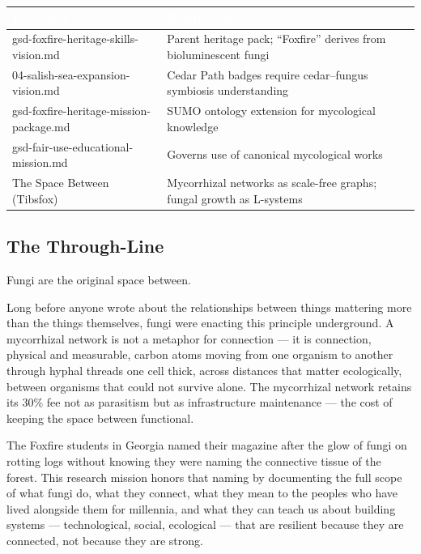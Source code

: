 \documentclass[11pt,letterpaper]{article}
\newcommand{\tableheader}[1]{\textbf{\sffamily\textcolor{white}{#1}}}
\begin{document}
\begin{center}
\begin{tabularx}{\textwidth}{L{4.5cm}X}
\toprule
{}
\tableheader{Document} & \tableheader{Relationship} \\
\midrule
gsd-foxfire-heritage-skills-vision.md & Parent heritage pack; ``Foxfire'' derives from bioluminescent fungi \\
04-salish-sea-expansion-vision.md & Cedar Path badges require cedar--fungus symbiosis understanding \\
gsd-foxfire-heritage-mission-package.md & SUMO ontology extension for mycological knowledge \\
gsd-fair-use-educational-mission.md & Governs use of canonical mycological works \\
The Space Between (Tibsfox) & Mycorrhizal networks as scale-free graphs; fungal growth as L-systems \\
\bottomrule
\end{tabularx}
\end{center}

\subsection{The Through-Line}

Fungi are the original space between.

Long before anyone wrote about the relationships between things mattering more than the things themselves, fungi were enacting this principle underground. A mycorrhizal network is not a metaphor for connection --- it is connection, physical and measurable, carbon atoms moving from one organism to another through hyphal threads one cell thick, across distances that matter ecologically, between organisms that could not survive alone. The mycorrhizal network retains its 30\% fee not as parasitism but as infrastructure maintenance --- the cost of keeping the space between functional.

The Foxfire students in Georgia named their magazine after the glow of fungi on rotting logs without knowing they were naming the connective tissue of the forest. This research mission honors that naming by documenting the full scope of what fungi do, what they connect, what they mean to the peoples who have lived alongside them for millennia, and what they can teach us about building systems --- technological, social, ecological --- that are resilient because they are connected, not because they are strong.
\end{document}

